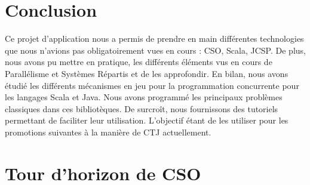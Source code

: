 \documentclass[a4paper,11pt,french]{report}
\begin{document}
\chapter{Conclusion}

Ce projet d'application nous a permis de prendre en main différentes technologies que nous n'avions pas obligatoirement vues en cours : CSO, Scala, JCSP. De plus, nous avons pu mettre en pratique, les différents éléments vus en cours de Parallélisme et Systèmes Répartis et de les approfondir. En bilan, nous avons étudié les différents mécanismes en jeu pour la programmation concurrente pour les langages Scala et Java. Nous avons programmé les principaux problèmes classiques dans ces bibliotèques. De surcroît, nous fournissons des tutoriels permettant de faciliter leur utilisation. L'objectif étant de les utiliser pour les promotions suivantes à la manière de CTJ actuellement.

\appendix
\chapter{ Tour d'horizon de CSO }
\label{chap:cso}
\end{document}
